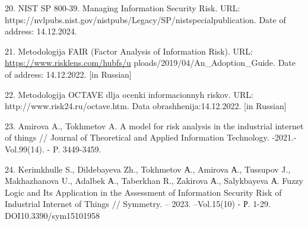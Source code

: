 \begin{references}
20. NIST SP 800-39. Managing Information Security Risk. URL:\\
https://nvlpubs.nist.gov/nistpubs/Legacy/SP/nistspecialpublication. Date
of address: 14.12.2024.

21. Metodologija FAIR (Factor Analysis of Information Risk). URL:
\url{https://www.risklens.com/hubfs/u}
ploads/2019/04/An\_Adoption\_Guide. Date of address:
14.12.2022. {[}in Russian{]}

22. Metodologija OCTAVE dlja ocenki informacionnyh riskov. URL:
http://www.risk24.ru/octave.htm. Data obrashhenija:14.12.2022. {[}in
Russian{]}

23. Amirova A., Tokhmetov A. A model for risk analysis in the industrial
internet of things // Journal of Theoretical and Applied Information
Technology. -2021.- Vol.99(14). - P. 3449-3459.

24. Kerimkhulle S., Dildebayeva Zh., Tokhmetov А., Amirova А., Tussupov
J., Makhazhanova U., Adalbek А., Taberkhan R., Zakirova А., Salykbayeva
А. Fuzzy Logic and Its Application in the Assessment of Information
Security Risk of Industrial Internet of Things // Symmetry. -- 2023.
--Vol.15(10) - Р. 1-29. DOI10.3390/sym15101958
\end{references}

